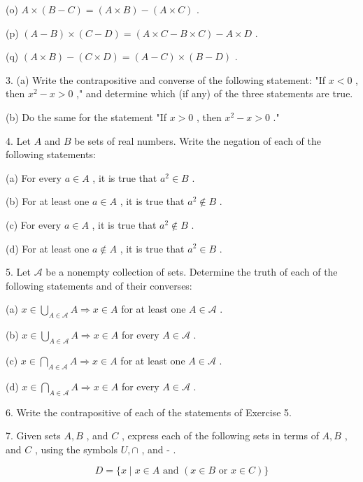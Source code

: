 \documentclass[10pt]{article}
\begin{document}
(o) \(A \times  \left( {B - C}\right)  = \left( {A \times  B}\right)  - \left( {A \times  C}\right)\) .

(p) \(\left( {A - B}\right)  \times  \left( {C - D}\right)  = \left( {A \times  C - B \times  C}\right)  - A \times  D\) .

(q) \(\left( {A \times  B}\right)  - \left( {C \times  D}\right)  = \left( {A - C}\right)  \times  \left( {B - D}\right)\) .

3. (a) Write the contrapositive and converse of the following statement: "If \(x < 0\) , then \({x}^{2} - x > 0\) ," and determine which (if any) of the three statements are true.

(b) Do the same for the statement "If \(x > 0\) , then \({x}^{2} - x > 0\) ."

4. Let \(A\) and \(B\) be sets of real numbers. Write the negation of each of the following statements:

(a) For every \(a \in  A\) , it is true that \({a}^{2} \in  B\) .

(b) For at least one \(a \in  A\) , it is true that \({a}^{2} \notin  B\) .

(c) For every \(a \in  A\) , it is true that \({a}^{2} \notin  B\) .

(d) For at least one \(a \notin  A\) , it is true that \({a}^{2} \in  B\) .

5. Let \(\mathcal{A}\) be a nonempty collection of sets. Determine the truth of each of the following statements and of their converses:

(a) \(x \in  \mathop{\bigcup }\limits_{{A \in  \mathcal{A}}}A \Rightarrow  x \in  A\) for at least one \(A \in  \mathcal{A}\) .

(b) \(x \in  \mathop{\bigcup }\limits_{{A \in  \mathcal{A}}}A \Rightarrow  x \in  A\) for every \(A \in  \mathcal{A}\) .

(c) \(x \in  \mathop{\bigcap }\limits_{{A \in  \mathcal{A}}}A \Rightarrow  x \in  A\) for at least one \(A \in  \mathcal{A}\) .

(d) \(x \in  \mathop{\bigcap }\limits_{{A \in  \mathcal{A}}}A \Rightarrow  x \in  A\) for every \(A \in  \mathcal{A}\) .

6. Write the contrapositive of each of the statements of Exercise 5.

7. Given sets \(A,B\) , and \(C\) , express each of the following sets in terms of \(A,B\) , and \(C\) , using the symbols \(U, \cap\) , and - .

\[
D = \{ x \mid  x \in  A\text{ and }\left( {x \in  B\text{ or }x \in  C}\right) \}
\]
\end{document}
